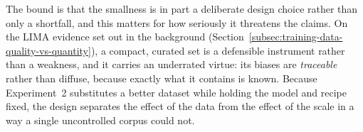 The bound is that the smallness is in part a deliberate design choice rather than only a shortfall, and this matters for how seriously it threatens the claims. On the LIMA evidence set out in the background (Section~\ref{subsec:training-data-quality-vs-quantity}), a compact, curated set is a defensible instrument rather than a weakness, and it carries an underrated virtue: its biases are \emph{traceable} rather than diffuse, because exactly what it contains is known. Because Experiment~2 substitutes a better dataset while holding the model and recipe fixed, the design separates the effect of the data from the effect of the scale in a way a single uncontrolled corpus could not.

%
%
